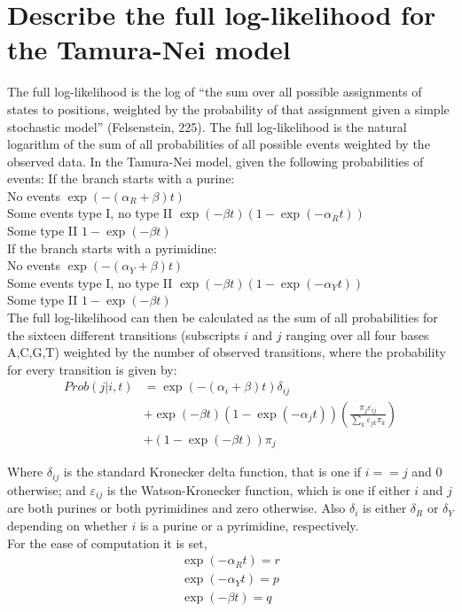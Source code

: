 \documentclass[12pt,twoside]{article}
\begin{document}
\section{Describe the full log-likelihood for the Tamura-Nei model}
The full log-likelihood is the log of “the sum over all possible assignments of states to positions, weighted by the probability of that assignment given a simple stochastic model” (Felsenstein, 225). The full log-likelihood is the natural logarithm of the sum of all probabilities of all possible events weighted by the observed data. In the Tamura-Nei model, given the following probabilities of events:
If the branch starts with a purine: \\
No events \quad \quad $\exp{(-(\alpha_{R}+\beta)t)}$ \\
Some events type I, no type II \quad $\exp{(-\beta t)}(1-\exp{(-\alpha_{R}t)})$ \\
Some type II \quad \quad $1-\exp{(-\beta t)}$ \\

If the branch starts with a pyrimidine:\\
No events \quad \quad $\exp{(-(\alpha_{Y}+\beta)t)}$ \\
Some events type I, no type II \quad $\exp{(-\beta t)}(1-\exp{(-\alpha_{Y}t)})$ \\
Some type II \quad \quad $1-\exp{(-\beta t)}$ \\

The full log-likelihood can then be calculated as the sum of all probabilities for the sixteen different transitions (subscripts $i$ and $j$ ranging over all four bases A,C,G,T) weighted by the number of observed transitions, where the probability for every transition is given by:
\begin{align}
Prob(j|i,t) &= \exp{(-(\alpha_{i}+\beta)t)} \delta_{ij} \\
    &+ \exp{(-\beta t)}(1-\exp{(-\alpha_{j}t)}) (\frac{\pi_{j}\varepsilon_{ij}}{\sum_{k}\varepsilon_{jk}\pi_{k}}) \\
    &+ (1-\exp{(-\beta t)})\pi_{j}
\end{align}

Where $\delta_{ij}$ is the standard Kronecker delta function, that is one if $i == j$ and $0$ otherwise; and $\varepsilon_{ij}$ is the Watson-Kronecker function, which is one if either $i$ and $j$ are both purines or both pyrimidines and zero otherwise. Also $\delta_{i}$ is either $\delta_{R}$ or $\delta_{Y}$ depending on whether $i$ is a purine or a pyrimidine, respectively. \\
For the ease of computation it is set,
\begin{align}
\exp{(-\alpha_{R}t)} = r \\
\exp{(-\alpha_{Y}t)} = p \\
\exp{(-\beta t)} = q
\end{align}
\end{document}
